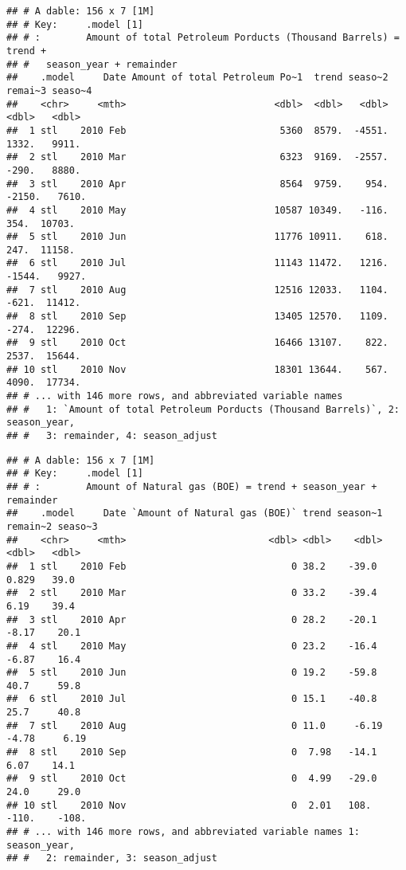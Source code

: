 \documentclass[
]{article}
\begin{document}
\begin{verbatim}
## # A dable: 156 x 7 [1M]
## # Key:     .model [1]
## # :        Amount of total Petroleum Porducts (Thousand Barrels) = trend +
## #   season_year + remainder
##    .model     Date Amount of total Petroleum Po~1  trend seaso~2 remai~3 seaso~4
##    <chr>     <mth>                          <dbl>  <dbl>   <dbl>   <dbl>   <dbl>
##  1 stl    2010 Feb                           5360  8579.  -4551.   1332.   9911.
##  2 stl    2010 Mar                           6323  9169.  -2557.   -290.   8880.
##  3 stl    2010 Apr                           8564  9759.    954.  -2150.   7610.
##  4 stl    2010 May                          10587 10349.   -116.    354.  10703.
##  5 stl    2010 Jun                          11776 10911.    618.    247.  11158.
##  6 stl    2010 Jul                          11143 11472.   1216.  -1544.   9927.
##  7 stl    2010 Aug                          12516 12033.   1104.   -621.  11412.
##  8 stl    2010 Sep                          13405 12570.   1109.   -274.  12296.
##  9 stl    2010 Oct                          16466 13107.    822.   2537.  15644.
## 10 stl    2010 Nov                          18301 13644.    567.   4090.  17734.
## # ... with 146 more rows, and abbreviated variable names
## #   1: `Amount of total Petroleum Porducts (Thousand Barrels)`, 2: season_year,
## #   3: remainder, 4: season_adjust
\end{verbatim}

\begin{verbatim}
## # A dable: 156 x 7 [1M]
## # Key:     .model [1]
## # :        Amount of Natural gas (BOE) = trend + season_year + remainder
##    .model     Date `Amount of Natural gas (BOE)` trend season~1 remain~2 seaso~3
##    <chr>     <mth>                         <dbl> <dbl>    <dbl>    <dbl>   <dbl>
##  1 stl    2010 Feb                             0 38.2    -39.0     0.829   39.0 
##  2 stl    2010 Mar                             0 33.2    -39.4     6.19    39.4 
##  3 stl    2010 Apr                             0 28.2    -20.1    -8.17    20.1 
##  4 stl    2010 May                             0 23.2    -16.4    -6.87    16.4 
##  5 stl    2010 Jun                             0 19.2    -59.8    40.7     59.8 
##  6 stl    2010 Jul                             0 15.1    -40.8    25.7     40.8 
##  7 stl    2010 Aug                             0 11.0     -6.19   -4.78     6.19
##  8 stl    2010 Sep                             0  7.98   -14.1     6.07    14.1 
##  9 stl    2010 Oct                             0  4.99   -29.0    24.0     29.0 
## 10 stl    2010 Nov                             0  2.01   108.   -110.    -108.  
## # ... with 146 more rows, and abbreviated variable names 1: season_year,
## #   2: remainder, 3: season_adjust
\end{verbatim}
\end{document}
